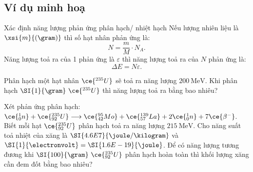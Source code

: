 \subsection{Ví dụ minh hoạ}
\begin{dang}{Xác định năng lượng phản ứng phân hạch/ nhiệt hạch}
		Nếu lượng nhiên liệu là $\xsi{m}{\left(\gram\right)}$ thì số hạt nhân phản ứng là:
		$$N=\dfrac{m}{M}\cdot N_A.$$
		Năng lượng toả ra của 1 phản ứng là $\varepsilon$ thì năng lượng toả ra của $N$ phản ứng là:
		$$\Delta E=N\varepsilon.$$	
\end{dang}
\begin{vd}
Phân hạch một hạt nhân $\ce{^{235}U}$ sẽ toả ra năng lượng $\SI{200}{\mega\electronvolt}$. Khi phân hạch $\SI{1}{\gram}\ \ce{^{235}U}$ thì năng lượng toả ra bằng bao nhiêu?
\end{vd}
\begin{vd}
	Xét phản ứng phân hạch: $\ce{^1_0n}+\ce{^{235}_{92}U}\longrightarrow \ce{^{95}_{42}Mo}+\ce{^{139}_{57}La}+2\ce{^1_0n}+7\ce{\beta^{-}}$. Biết mỗi hạt $\ce{^{235}_{92}U}$ phân hạch toả ra năng lượng $\SI{215}{\mega\electronvolt}$. Cho năng suất toả nhiệt của xăng là $\SI{4.6E7}{\joule/\kilogram}$ và $\SI{1}{\electronvolt}=\SI{1.6E-19}{\joule}$. Để có năng lượng tương đương khi  $\SI{100}{\gram}\ \ce{^{235}_{92}U}$ phân hạch hoàn toàn thì khối lượng xăng cần đem đốt bằng bao nhiêu?
\end{vd}
